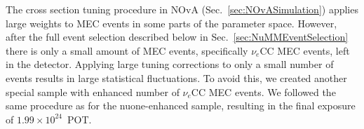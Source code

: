 The cross section tuning procedure in \gls{NOvA} (Sec.~\ref{sec:NOvASimulation}) applies large weights to \gls{MEC} events in some parts of the parameter space. However, after the full event selection described below in Sec.~\ref{sec:NuMMEventSelection} there is only a small amount of \gls{MEC} events, specifically $\nu_e$\gls{CC} \gls{MEC} events, left in the detector. Applying large tuning corrections to only a small number of events results in large statistical fluctuations. To avoid this, we created another special sample with enhanced number of $\nu_e$\gls{CC} \gls{MEC} events. We followed the same procedure as for the \gls{nuone}-enhanced sample, resulting in the final exposure of $1.99\times10^{24}$~\gls{POT}.

